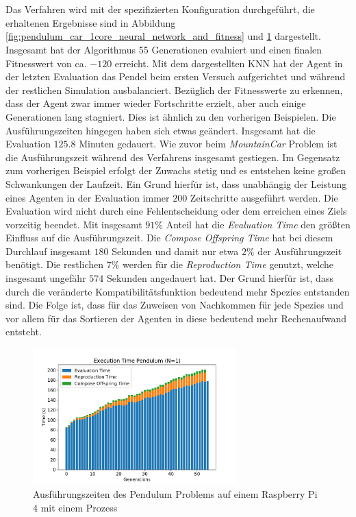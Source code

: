 \\\\
Das Verfahren wird mit der spezifizierten Konfiguration durchgeführt, die erhaltenen Ergebnisse sind in Abbildung \ref{fig:pendulum_car_1core_neural_network_and_fitness} und \ref{fig:pendulum_1core_1pi_time} dargestellt. Insgesamt hat der Algorithmus 55 Generationen evaluiert und einen finalen Fitnesswert von ca. $-120$ erreicht. Mit dem dargestellten \ac{KNN} hat der Agent in der letzten Evaluation das Pendel beim ersten Versuch aufgerichtet und während der restlichen Simulation ausbalanciert. Bezüglich der Fitnesswerte zu erkennen, dass der Agent zwar immer wieder Fortschritte erzielt, aber auch einige Generationen lang stagniert. Dies ist ähnlich zu den vorherigen Beispielen. Die Ausführungszeiten hingegen haben sich etwas geändert. Insgesamt hat die Evaluation $125.8$ Minuten gedauert. Wie zuvor beim \emph{MountainCar} Problem ist die Ausführungszeit während des Verfahrens insgesamt gestiegen. Im Gegensatz zum vorherigen Beispiel erfolgt der Zuwachs stetig und es entstehen keine großen Schwankungen der Laufzeit. Ein Grund hierfür ist, dass unabhängig der Leistung eines Agenten in der Evaluation immer $200$ Zeitschritte ausgeführt werden. Die Evaluation wird nicht durch eine Fehlentscheidung oder dem erreichen eines Ziels vorzeitig beendet. Mit insgesamt $91\%$ Anteil hat die \emph{Evaluation Time} den größten Einfluss auf die Ausführungszeit. Die \emph{Compose Offspring Time} hat bei diesem Durchlauf insgesamt $180$ Sekunden und damit nur etwa $2\%$ der Ausführungszeit benötigt. Die restlichen $7\%$ werden für die \emph{Reproduction Time} genutzt, welche insgesamt ungefähr $574$ Sekunden angedauert hat. Der Grund hierfür ist, dass durch die veränderte Kompatibilitätsfunktion bedeutend mehr Spezies entstanden sind. Die Folge ist, dass für das Zuweisen von Nachkommen für jede Spezies und vor allem für das Sortieren der Agenten in diese bedeutend mehr Rechenaufwand entsteht. 

\begin{figure}[!h]
	\centering
	\includegraphics[width=0.7\textwidth]{./img/pendulum_single_core/pendulum_1_1core_1pi_time.pdf} 
	\caption{Ausführungszeiten des Pendulum Problems auf einem Raspberry Pi 4 mit einem Prozess}
	\label{fig:pendulum_1core_1pi_time}
\end{figure}



